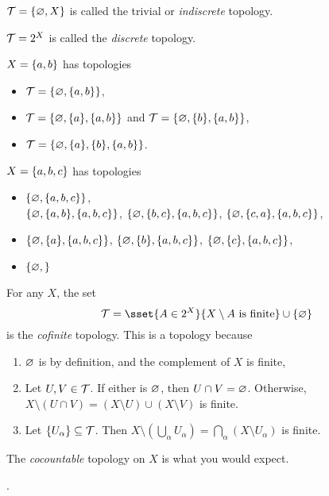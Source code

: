 \begin{examples}
    \item $\mathcal{T} = \{\varnothing, X\}$ is called the trivial or \emph{indiscrete}
        topology.
    \item $\mathcal{T} = 2^X$ is called the \emph{discrete} topology.
    \item $X = \{a, b\}$ has topologies
    \begin{itemize}
        \item $\mathcal{T} = \{\varnothing, \{a, b\}\}$,
        \item $\mathcal{T} = \{\varnothing, \{a\}, \{a, b\}\}$ and
            $\mathcal{T} = \{\varnothing, \{b\}, \{a, b\}\}$,
        \item $\mathcal{T} = \{\varnothing, \{a\}, \{b\}, \{a, b\}\}$.
    \end{itemize}
    \item $X = \{a, b, c\}$ has topologies
    \begin{itemize}
        \item $\{\varnothing, \{a, b, c\}\}$, \\
            $\{\varnothing, \{a, b\}, \{a, b, c\}\}$,
            $\{\varnothing, \{b, c\}, \{a, b, c\}\}$,
            $\{\varnothing, \{c, a\}, \{a, b, c\}\}$,
        \item $\{\varnothing, \{a\}, \{a, b, c\}\}$,
            $\{\varnothing, \{b\}, \{a, b, c\}\}$,
            $\{\varnothing, \{c\}, \{a, b, c\}\}$,
        \item $\{\varnothing, \}$
    \end{itemize}
    \item For any $X$, the set \[
        \T = \sset{A \in 2^X}{X \setminus A \text{ is finite}}
                \cup \set{\O}
    \] is the \emph{cofinite} topology.
    This is a topology because
    \begin{enumerate}[label=\small(T\arabic*)]
        \item $\varnothing$ is by definition, and the complement of $X$ is finite,
        \item Let $U, V \in \mathcal{T}$.
            If either is $\varnothing$, then $U \cap V = \varnothing$.
            Otherwise, $X \setminus (U \cap V) = (X \setminus U) \cup (X \setminus V)$
            is finite.
        \item Let $\{U_\alpha\} \subseteq \mathcal{T}$.
            Then $X \setminus (\bigcup_\alpha U_\alpha)
                = \bigcap_\alpha (X \setminus U_\alpha)$ is finite.
    \end{enumerate}
    \item The \emph{cocountable} topology on $X$ is what you would expect.
    \item {}.
\end{examples}

